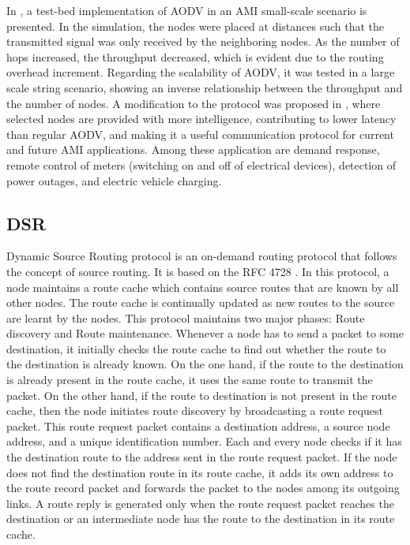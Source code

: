\documentclass[11pt,draftclsnofoot,onecolumn]{IEEEtran}
\begin{document}
In \cite{Toimoor2013}, a test-bed implementation of AODV in an AMI small-scale scenario is presented. In the simulation, the nodes were placed at distances such that the transmitted signal was only received by the neighboring nodes. As the number of hops increased, the throughput decreased, which is evident due to the routing overhead increment. Regarding the scalability of AODV, it was tested in a large scale string scenario, showing an inverse relationship between the throughput and the number of nodes. A modification to the protocol was proposed in \cite{Toimoor2013}, where selected nodes are provided with more intelligence, contributing to lower latency than regular AODV, and making it a useful communication protocol for current and future AMI applications. Among these application are demand response, remote control of meters (switching on and off of electrical devices), detection of power outages, and electric vehicle charging. 


\subsection{DSR}\label{dsr}

Dynamic Source Routing protocol is an on-demand routing protocol that follows the concept of source routing. It is based on the RFC 4728 \cite{Johnson2007}. In this protocol, a node maintains a route cache which contains source routes that are known by all other nodes. The route cache is continually updated as new routes to the source are learnt by the nodes. This protocol maintains two major phases: Route discovery and Route maintenance. Whenever a node has to send a packet to some destination, it initially checks the route cache to find out whether the route to the destination is already known. On the one hand, if the route to the destination is already present in the route cache, it uses the same route to transmit the packet. On the other hand, if the route to destination is not present in the route cache, then the node initiates route discovery by broadcasting a route request packet. This route request packet contains a destination address, a source node address, and a unique identification number. Each and every node checks if it has the destination route to the address sent in the route request packet. If the node does not find the destination route in its route cache, it adds its own address to the route record packet and forwards the packet to the nodes among its outgoing links. A route reply is generated only when the route request packet reaches the destination or an intermediate node has the route to the destination in its route cache. 
	
\end{document}
